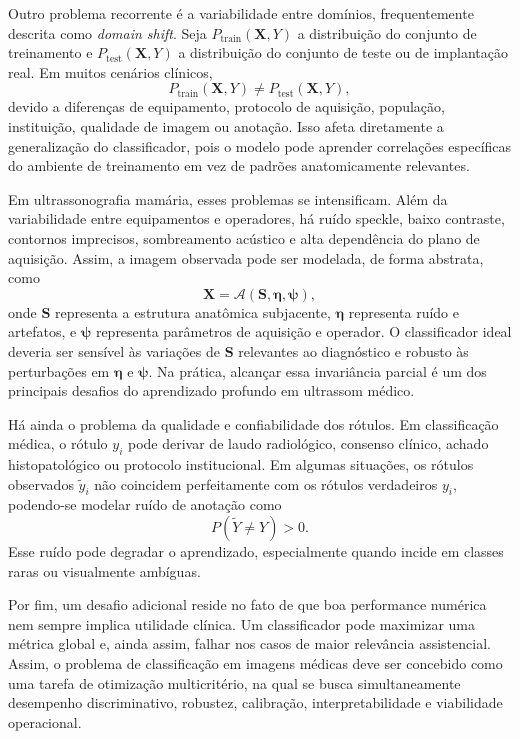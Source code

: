 \documentclass[tcc,capa]{texufpel}
\begin{document}
Outro problema recorrente é a variabilidade entre domínios, frequentemente descrita como \textit{domain shift}. Seja $P_{\text{train}}(\mathbf{X},Y)$ a distribuição do conjunto de treinamento e $P_{\text{test}}(\mathbf{X},Y)$ a distribuição do conjunto de teste ou de implantação real. Em muitos cenários clínicos,
\begin{equation}
P_{\text{train}}(\mathbf{X},Y) \neq P_{\text{test}}(\mathbf{X},Y),
\end{equation}
devido a diferenças de equipamento, protocolo de aquisição, população, instituição, qualidade de imagem ou anotação. Isso afeta diretamente a generalização do classificador, pois o modelo pode aprender correlações específicas do ambiente de treinamento em vez de padrões anatomicamente relevantes.

Em ultrassonografia mamária, esses problemas se intensificam. Além da variabilidade entre equipamentos e operadores, há ruído speckle, baixo contraste, contornos imprecisos, sombreamento acústico e alta dependência do plano de aquisição. Assim, a imagem observada pode ser modelada, de forma abstrata, como
\begin{equation}
\mathbf{X} = \mathcal{A}(\mathbf{S},\boldsymbol{\eta},\boldsymbol{\psi}),
\end{equation}
onde $\mathbf{S}$ representa a estrutura anatômica subjacente, $\boldsymbol{\eta}$ representa ruído e artefatos, e $\boldsymbol{\psi}$ representa parâmetros de aquisição e operador. O classificador ideal deveria ser sensível às variações de $\mathbf{S}$ relevantes ao diagnóstico e robusto às perturbações em $\boldsymbol{\eta}$ e $\boldsymbol{\psi}$. Na prática, alcançar essa invariância parcial é um dos principais desafios do aprendizado profundo em ultrassom médico.

Há ainda o problema da qualidade e confiabilidade dos rótulos. Em classificação médica, o rótulo $y_i$ pode derivar de laudo radiológico, consenso clínico, achado histopatológico ou protocolo institucional. Em algumas situações, os rótulos observados $\tilde{y}_i$ não coincidem perfeitamente com os rótulos verdadeiros $y_i$, podendo-se modelar ruído de anotação como
\begin{equation}
P(\tilde{Y} \neq Y) > 0.
\end{equation}
Esse ruído pode degradar o aprendizado, especialmente quando incide em classes raras ou visualmente ambíguas.

Por fim, um desafio adicional reside no fato de que boa performance numérica nem sempre implica utilidade clínica. Um classificador pode maximizar uma métrica global e, ainda assim, falhar nos casos de maior relevância assistencial. Assim, o problema de classificação em imagens médicas deve ser concebido como uma tarefa de otimização multicritério, na qual se busca simultaneamente desempenho discriminativo, robustez, calibração, interpretabilidade e viabilidade operacional.
\end{document}
